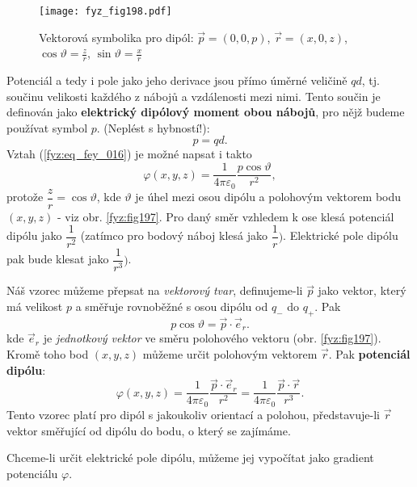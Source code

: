   \begin{figure}[ht!] %
    \centering
    \texttt{[image: fyz\_fig198.pdf]}
    \caption{Vektorová symbolika pro dipól: \(\vec{p} = (0, 0, p)\), \(\vec{r} = (x, 0, z)\), 
             \(\cos\vartheta = \frac{z}{r}\), \(\sin\vartheta = \frac{x}{r}\)}
    \label{fyz:fig198}
  \end{figure}
  Potenciál a tedy i pole jako jeho derivace jsou přímo úměrné veličině \(qd\), tj. součinu
  velikosti každého z nábojů a vzdálenosti mezi nimi. Tento součin je definován jako
  \textbf{elektrický dipólový moment obou nábojů}, pro nějž budeme používat symbol \(p\). (Neplést s
  hybností!):
  \begin{equation}\label{fyz:eq_fey_017}
    p = qd.
  \end{equation}
  Vztah (\ref{fyz:eq_fey_016}) je možné napsat i takto
  \begin{equation}\label{fyz:eq_fey_018}
    \varphi(x,y,z) = \dfrac{1}{4\pi\varepsilon_0}\dfrac{p\cos\vartheta}{r^2},
  \end{equation}
  protože \(\dfrac{z}{r} = \cos\vartheta\), kde \(\vartheta\) je úhel mezi osou dipólu a polohovým
  vektorem bodu \((x, y, z)\) - viz obr. \ref{fyz:fig197}. Pro daný směr vzhledem k ose klesá
  potenciál dipólu jako \(\dfrac{1}{r^2}\) (zatímco pro bodový náboj klesá jako \(\dfrac{1}{r})\).
  Elektrické pole dipólu pak bude klesat jako \(\dfrac{1}{r^3})\).

  Náš vzorec můžeme přepsat na \emph{vektorový tvar}, definujeme-li \(\vec{p}\) jako vektor, který
  má velikost \(p\) a směřuje rovnoběžné s osou dipólu od \(q_-\) do \(q_+\). Pak
   \begin{equation}\label{fyz:eq_fey_019}
    p\cos\vartheta = \vec{p}\cdot\vec{e}_r.
  \end{equation}
  kde \(\vec{e}_r\) je \emph{jednotkový vektor} ve směru polohového vektoru (obr. \ref{fyz:fig197}).
  Kromě toho bod \((x, y, z)\) můžeme určit polohovým vektorem \(\vec{r}\). Pak \textbf{potenciál
  dipólu}:
  \begin{equation}\label{fyz:eq_fey_020}
    \varphi(x,y,z) = \dfrac{1}{4\pi\varepsilon_0}\dfrac{\vec{p}\cdot\vec{e}_r}{r^2}
                   = \dfrac{1}{4\pi\varepsilon_0}\dfrac{\vec{p}\cdot\vec{r}}{r^3}.
  \end{equation}
  Tento vzorec platí pro dipól s jakoukoliv orientací a polohou, představuje-li \(\vec{r}\) vektor
  směřující od dipólu do bodu, o který se zajímáme.

  Chceme-li určit elektrické pole dipólu, můžeme jej vypočítat jako gradient potenciálu 
  \(\varphi\).

